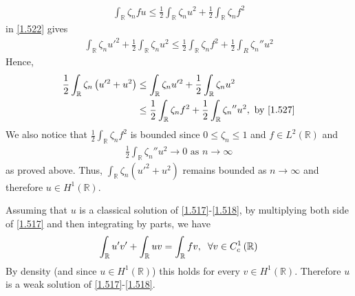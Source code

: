 \documentclass[a4paper,oneside]{book}
\numberwithin{equation}{chapter}
\begin{document}
\begin{align}
\int_{\mathbb{R}} {{\zeta _n}fu}  \le \frac{1}{2}\int_{\mathbb{R}} {{\zeta _n}{u^2}}  + \frac{1}{2}\int_{\mathbb{R}} {{\zeta _n}{f^2}} 
\end{align}
in \eqref{1.522} gives
\begin{align}
\label{1.527}
\int_{\mathbb{R}} {{\zeta _n}u{'^2}}  + \frac{1}{2}\int_{\mathbb{R}} {{\zeta _n}{u^2}}  \le \frac{1}{2}\int_{\mathbb{R}} {{\zeta _n}{f^2}}  + \frac{1}{2}\int_R {{\zeta _n}''{u^2}} 
\end{align}
Hence,
\begin{align}
\frac{1}{2}\int_{\mathbb{R}} {{\zeta _n}\left( {u{'^2} + {u^2}} \right)}  &\le \int_{\mathbb{R}}  {{\zeta _n}u{'^2}}  + \frac{1}{2}\int_{\mathbb{R}}  {{\zeta _n}{u^2}} \\
 &\le \frac{1}{2}\int_{\mathbb{R}}  {{\zeta _n}{f^2}}  + \frac{1}{2}\int_{\mathbb{R}}  {{\zeta _n}''{u^2}},\mbox{ by \eqref{1.527}}
\end{align}
We also notice that $\frac{1}{2}\int_{\mathbb{R}}  {{\zeta _n}{f^2}} $ is bounded since $0\le \zeta _n\le 1$ and $f\in L^2\left(\mathbb{R}\right)$ and 
\begin{align}
\frac{1}{2}\int_{\mathbb{R}} {{\zeta _n}''{u^2}}  \to 0\mbox{ as } n \to \infty 
\end{align}
as proved above. Thus, $\int_{\mathbb{R}} {{\zeta _n}\left( {u{'^2} + {u^2}} \right)} $ remains bounded as $n\to \infty$ and therefore $u\in H^1\left(\mathbb{R}\right)$. 

Assuming that $u$ is a classical solution of \eqref{1.517}-\eqref{1.518}, by multiplying both side of \eqref{1.517} and then integrating by parts, we have
\begin{align}
\int_{\mathbb{R}} {u'v'}  + \int_{\mathbb{R}} {uv}  = \int_{\mathbb{R}} {fv} ,\hspace{0.2cm}\forall v \in C_c^1\left( \mathbb{R} \right)
\end{align}
By density (and since $u\in H^1\left(\mathbb{R}\right)$) this holds for every $v\in H^1\left(\mathbb{R}\right)$. Therefore $u$ is a weak solution of \eqref{1.517}-\eqref{1.518}. 
\end{document}
